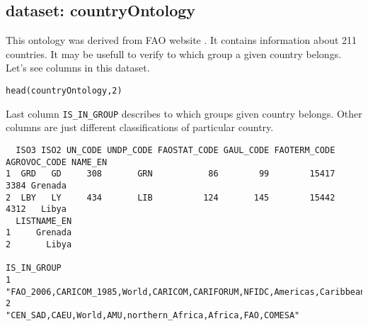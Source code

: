 \subsection{dataset: countryOntology}
This ontology was derived from FAO website \cite{FAOwebsite}. It contains information about 211 countries. It may be usefull to verify to which group a given country belongs. Let's see columns in this dataset.

\begin{shaded}\begin{verbatim}
head(countryOntology,2)
\end{verbatim}\end{shaded}

Last column \verb:IS_IN_GROUP: describes to which groups given country belongs. Other columns are just different classifications of particular country. 

\begin{shaded}\begin{verbatim}
  ISO3 ISO2 UN_CODE UNDP_CODE FAOSTAT_CODE GAUL_CODE FAOTERM_CODE AGROVOC_CODE NAME_EN
1  GRD   GD     308       GRN           86        99        15417         3384 Grenada
2  LBY   LY     434       LIB          124       145        15442         4312   Libya
  LISTNAME_EN
1     Grenada
2       Libya
                                                                        IS_IN_GROUP
1 "FAO_2006,CARICOM_1985,World,CARICOM,CARIFORUM,NFIDC,Americas,Caribbean,FAO,SIDS"
2                        "CEN_SAD,CAEU,World,AMU,northern_Africa,Africa,FAO,COMESA"
\end{verbatim}\end{shaded}



